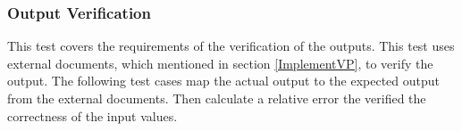\documentclass[12pt, titlepage]{article}
\begin{document}
\subsubsection{Output Verification}\label{tP_VO} 


This test covers the requirements of the verification of the outputs. This test
uses external documents, which mentioned in section \ref{ImplementVP}, to verify the output. The following test cases map the actual output to the expected output from the external documents. Then calculate a relative error the verified the correctness of the input values.
\end{document}
